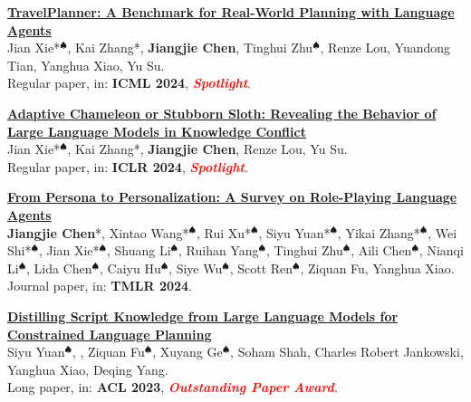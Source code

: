 \documentclass{resume}
\begin{document}
\begin{enumerate}[label={[\arabic*]}]
  \item \textbf{\href{https://jiangjiechen.github.io/publication/travelplanner}{TravelPlanner: A Benchmark for Real-World Planning with Language Agents}}\\
  \label{paper:travelplanner}
  Jian Xie*$^\spadesuit$, Kai Zhang*, \textbf{Jiangjie Chen}, Tinghui Zhu$^\spadesuit$, Renze Lou, Yuandong Tian, Yanghua Xiao, Yu Su.\\
  Regular paper, in: \textbf{ICML 2024}, \textcolor{red}{\textbf{\textit{Spotlight}}}.

  
  \item \textbf{\href{https://jiangjiechen.github.io/publication/sloth/}{Adaptive Chameleon or Stubborn Sloth: Revealing the Behavior of Large Language Models in Knowledge Conflict}}\\
  \label{paper:sloth}
  Jian Xie*$^\spadesuit$, Kai Zhang*, \textbf{Jiangjie Chen}, Renze Lou, Yu Su.\\
  Regular paper, in: \textbf{ICLR 2024}, \textcolor{red}{\textbf{\textit{Spotlight}}}.

   
  \item \textbf{\href{https://jiangjiechen.github.io/publication/rplasurvey}{From Persona to Personalization: A Survey on Role-Playing Language Agents}}\\
  \label{paper:rplasurvey}
  \textbf{Jiangjie Chen}*, Xintao Wang*$^\spadesuit$, Rui Xu*$^\spadesuit$, Siyu Yuan*$^\spadesuit$, Yikai Zhang*$^\spadesuit$, Wei Shi*$^\spadesuit$, Jian Xie*$^\spadesuit$, Shuang Li$^\spadesuit$, Ruihan Yang$^\spadesuit$, Tinghui Zhu$^\spadesuit$, Aili Chen$^\spadesuit$, Nianqi Li$^\spadesuit$, Lida Chen$^\spadesuit$, Caiyu Hu$^\spadesuit$, Siye Wu$^\spadesuit$, Scott Ren$^\spadesuit$, Ziquan Fu, Yanghua Xiao.\\
  Journal paper, in: \textbf{TMLR 2024}.
  
  \item \textbf{\href{https://jiangjiechen.github.io/publication/coscript/}{Distilling Script Knowledge from Large Language Models for Constrained Language Planning}}\\
  \label{paper:coscript}
  Siyu Yuan$^\spadesuit$, \textbf{\color{black}{Jiangjie Chen}}, Ziquan Fu$^\spadesuit$, Xuyang Ge$^\spadesuit$, Soham Shah, Charles Robert Jankowski, Yanghua Xiao, Deqing Yang.\\
  Long paper, in: \textbf{ACL 2023}, \textcolor{red}{\textbf{\textit{Outstanding Paper Award}}}.

  
  
\end{enumerate}
\end{document}

